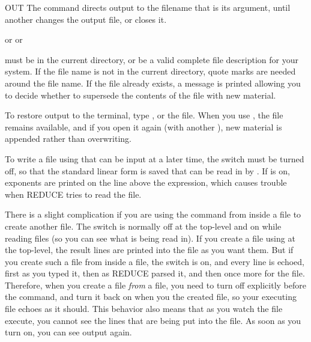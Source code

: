 \begin{Command}[out]{OUT}
The  command directs output to the filename that is its argument,
until another  changes the output file, or  closes it.
\begin{Syntax}
  or   or 
\end{Syntax}

 must be in the current directory, or be a valid complete
file description for your system.  If the file name is not
in the current directory, quote marks are needed around the file name.
If the file already exists, a message is printed allowing you to decide
whether to supersede the contents of the file with new material.

\begin{Comments}
To restore output to the terminal, type , or  the
file.  When you use , the file remains available, and if you
open it again (with another ), new material is appended rather
than overwriting.

To write a file using  that can be input at a later time, the
switch  must be turned off, so that the standard linear form
is saved that can be read in by .  If  is on, exponents
are printed on the line above the expression, which causes trouble
when REDUCE tries to read the file.

There is a slight complication if you are using the  command from
inside a file to create another file.  The  switch is normally
off at the top-level and on while reading files (so you can see what is
being read in).  If you create a file using  at the top-level,
the result lines are printed into the file as you want them.  But if you
create such a file from inside a file, the  switch is on, and
every line is echoed, first as you typed it, then as REDUCE parsed it, and
then once more for the file.  Therefore, when you create a file {\it from}
a file, you need to turn  off explicitly before the 
command, and turn it back on when you  the created file, so your
executing file echoes as it should.  This behavior also means that as you
watch the file execute, you cannot see the lines that are being put into
the  file.  As soon as you turn  on, you can see
output again.
\end{Comments}
\end{Command}


